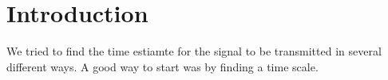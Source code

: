 \section{Introduction}
We tried to find the time estiamte for the signal to be transmitted in several different ways. 
A good way to start was by finding a time scale. 

